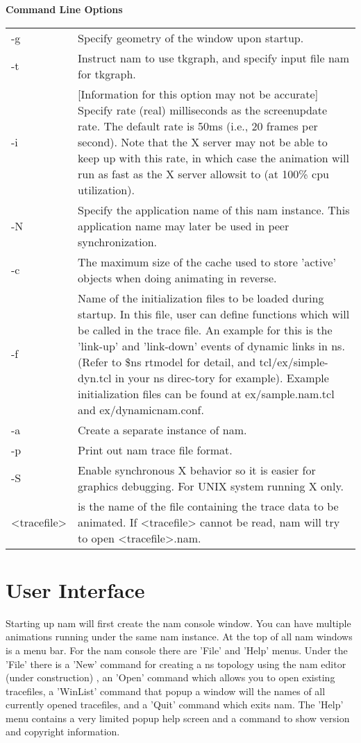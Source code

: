 \textbf{Command Line Options}

\begin{tabular}{ll}
-g & Specify geometry of the window upon startup. \\

-t & Instruct nam to use tkgraph, and specify input file nam for tkgraph. \\

-i & [Information  for  this  option  may  not  be  accurate]  Specify rate (real)  milliseconds  as  the  screenupdate rate. The default rate is 50ms (i.e., 20 frames per second). Note that the X server may not be able to keep up with this rate, in which case the animation will run as fast as the X server allowsit to (at 100\% cpu utilization). \\
-N & Specify the application name of this nam instance. This application name may later be used in peer synchronization. \\
-c & The  maximum  size  of  the  cache  used  to  store  'active' objects when doing animating in reverse. \\
-f & Name of the initialization files to be loaded during startup. In this file, user can define functions which will be called in the trace file. An example for this is the 'link-up' and 'link-down' events of dynamic links in ns. (Refer to \$ns rtmodel for detail, and tcl/ex/simple-dyn.tcl in your ns direc-tory for example). Example initialization files can be found at ex/sample.nam.tcl and ex/dynamicnam.conf. \\
-a & Create a separate instance of nam. \\
-p & Print out nam trace file format. \\
-S & Enable synchronous X behavior so it is easier for graphics debugging. For UNIX system running X only. \\
<tracefile> & is the name of the file containing the trace data to be animated.  If <tracefile> cannot be read, nam will try to open <tracefile>.nam. \\
\end{tabular}


\section{User Interface}
\label{sec:userinterface}

Starting up nam will first create the nam console window.  You can have multiple animations running under the same nam instance.  At the top of all nam windows is a menu bar.  For the nam console there are 'File' and 'Help' menus.  Under the 'File' there is a 'New' command for creating a ns topology using the nam editor (under construction) , an 'Open' command which allows you to open existing tracefiles, a 'WinList' command that popup a window will the names of all currently opened tracefiles, and a 'Quit' command which exits nam. The 'Help' menu contains a very limited popup help screen and a command to show version and copyright information. 

